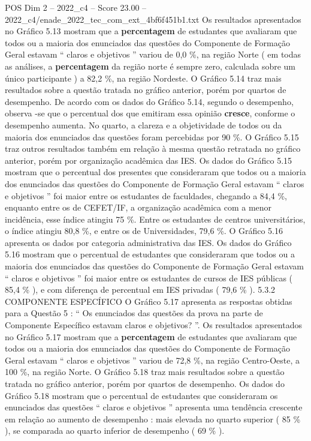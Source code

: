 \begin{textsample}{POS Dim 2 – 2022\_c4 – Score 23.00 – 2022\_c4/enade\_2022\_tec\_com\_ext\_4bf6f451b1.txt}
Os resultados apresentados no Gráfico 5.13 mostram que a \textbf{percentagem} de estudantes que avaliaram que todos ou a maioria dos enunciados das questões do Componente de Formação Geral estavam “ claros e objetivos ” variou de 0,0 \%, na região Norte ( em todas as análises, a \textbf{percentagem} da região norte é sempre zero, calculada sobre um único participante ) a 82,2 \%, na região Nordeste.
O Gráfico 5.14 traz mais resultados sobre a questão tratada no gráfico anterior, porém por quartos de desempenho.
De acordo com os dados do Gráfico 5.14, segundo o desempenho, observa -se que o percentual dos que emitiram essa opinião \textbf{cresce}, conforme o desempenho aumenta.
No quarto, a clareza e a objetividade de todos ou da maioria dos enunciados das questões foram percebidas por 90 \%.
O Gráfico 5.15 traz outros resultados também em relação à mesma questão retratada no gráfico anterior, porém por organização acadêmica das IES.
Os dados do Gráfico 5.15 mostram que o percentual dos presentes que consideraram que todos ou a maioria dos enunciados das questões do Componente de Formação Geral estavam “ claros e objetivos ” foi maior entre os estudantes de faculdades, chegando a 84,4 \%, enquanto entre os de CEFET/IF, a organização acadêmica com a menor incidência, esse índice atingiu 75 \%.
Entre os estudantes de centros universitários, o índice atingiu 80,8 \%, e entre os de Universidades, 79,6 \%.
O Gráfico 5.16 apresenta os dados por categoria administrativa das IES.
Os dados do Gráfico 5.16 mostram que o percentual de estudantes que consideraram que todos ou a maioria dos enunciados das questões do Componente de Formação Geral estavam “ claros e objetivos ” foi maior entre os estudantes de cursos de IES públicas ( 85,4 \% ), e com diferença de percentual em IES privadas ( 79,6 \% ). 5.3.2 COMPONENTE ESPECÍFICO O Gráfico 5.17 apresenta as respostas obtidas para a Questão 5 : “ Os enunciados das questões da prova na parte de Componente Específico estavam claros e objetivos? ”.
Os resultados apresentados no Gráfico 5.17 mostram que a \textbf{percentagem} de estudantes que avaliaram que todos ou a maioria dos enunciados das questões do Componente de Formação Geral estavam “ claros e objetivos ” variou de 72,8 \%, na região Centro-Oeste, a 100 \%, na região Norte.
O Gráfico 5.18 traz mais resultados sobre a questão tratada no gráfico anterior, porém por quartos de desempenho.
Os dados do Gráfico 5.18 mostram que o percentual de estudantes que consideraram os enunciados das questões “ claros e objetivos ” apresenta uma tendência crescente em relação ao aumento de desempenho : mais elevada no quarto superior ( 85 \% ), se comparada ao quarto inferior de desempenho ( 69 \% ).

\end{textsample}
